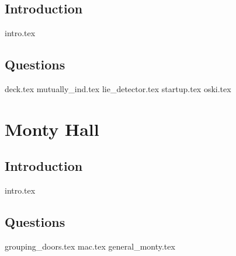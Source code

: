 \documentclass{exam}
\begin{document}
\subsection{Introduction}
{intro.tex}
\subsection{Questions}
\begin{questions}
{deck.tex}
{mutually_ind.tex}
{lie_detector.tex}
{startup.tex}
{oski.tex}
\end{questions}

\section{Monty Hall}
\subsection{Introduction}
{intro.tex}
\subsection{Questions}
\begin{questions}
{grouping_doors.tex}
{mac.tex}
{general_monty.tex}
\end{questions}
\end{document}

